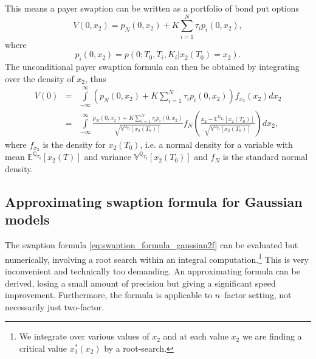 \documentclass[11pt,a4paper]{article}
\theoremstyle{break} %
\numberwithin{equation}{section}
\begin{document}
This means a payer swaption can be written as a portfolio of bond put options
\begin{equation*}
  V(0,{x_2}) = {p_N}(0,{x_2}) + K\sum\limits_{i = 1}^N {{\tau _i}{p_i}(0,{x_2})},
\end{equation*}
where
\begin{equation*}
  {p_i}(0,{x_2}) = p(0;{T_0},{T_i},{K_i}|{x_2}(T_0) = {x_2}).
\end{equation*}
The unconditional payer swaption formula can then be obtained by integrating over the density of $x_2$, thus
\begin{eqnarray}
V(0) &=& \int\limits_{ - \infty }^\infty  {\left( {{p_N}(0,{x_2}) + K\sum\limits_{i = 1}^N {{\tau _i}{p_i}(0,{x_2})} } \right){f_{{x_2}}}({x_2})d{x_2}} \nonumber \nonumber \\
 &=& \int\limits_{ - \infty }^\infty  {\frac{{{p_N}(0,{x_2}) + K\sum\limits_{i = 1}^N {{\tau _i}{p_i}(0,{x_2})} }}{{\sqrt {{\mathbb{V}^{{\mathbb{Q}_{T_0}}}}[{x_2}(T_0)]} }}{f_N}\left( {\frac{{{x_2} - {\mathbb{E}^{{\mathbb{Q}_{T_0}}}}[{x_2}(T_0)]}}{{\sqrt {{\mathbb{V}^{{\mathbb{Q}_{T_0}}}}[{x_2}(T_0)]} }}} \right)d{x_2}},\label{eq:swaption_formula_gaussian2f}
\end{eqnarray}
where $f_{x_2}$ is the density for $x_2(T_0)$, i.e. a normal density for a variable with mean ${{\mathbb{E}^{{\mathbb{Q}_{T_0}}}}[{x_2}(T)]}$ and variance $\mathbb{V}{^{{\mathbb{Q}_{T_0}}}[{x_2}(T_0)]}$ and $f_N$ is the standard normal density.

\subsection{Approximating swaption formula for Gaussian models}
The swaption formula \eqref{eq:swaption_formula_gaussian2f} can be evaluated but numerically, involving a root search within an integral computation.\footnote{We integrate over various values of $x_2$ and at each value $x_2$ we are finding a critical value $x_1^*({x_2})$ by a root-search.} This is very inconvenient and technically too demanding. An approximating formula can be derived, losing a small amount of precision but giving a significant speed improvement. Furthermore, the formula is applicable to $n$--factor setting, not necessarily just two-factor. \\
\end{document}
